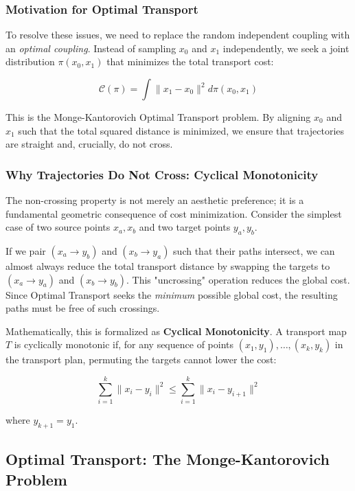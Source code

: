 \documentclass{book}
\begin{document}
\subsubsection*{Motivation for Optimal Transport}
To resolve these issues, we need to replace the random independent coupling with an \textit{optimal coupling}. Instead of sampling $x_0$ and $x_1$ independently, we seek a joint distribution $\pi(x_0, x_1)$ that minimizes the total transport cost:

\begin{equation}
\mathcal{C}(\pi) = \int \| x_1 - x_0 \|^2 d\pi(x_0, x_1)
\end{equation}

This is the Monge-Kantorovich Optimal Transport problem. By aligning $x_0$ and $x_1$ such that the total squared distance is minimized, we ensure that trajectories are straight and, crucially, do not cross.



\subsubsection*{Why Trajectories Do Not Cross: Cyclical Monotonicity}

The non-crossing property is not merely an aesthetic preference; it is a fundamental geometric consequence of cost minimization. Consider the simplest case of two source points $x_a, x_b$ and two target points $y_a, y_b$.

If we pair $(x_a \to y_b)$ and $(x_b \to y_a)$ such that their paths intersect, we can almost always reduce the total transport distance by swapping the targets to $(x_a \to y_a)$ and $(x_b \to y_b)$. This "uncrossing" operation reduces the global cost. Since Optimal Transport seeks the \textit{minimum} possible global cost, the resulting paths must be free of such crossings.

Mathematically, this is formalized as \textbf{Cyclical Monotonicity}. A transport map $T$ is cyclically monotonic if, for any sequence of points $(x_1, y_1), \dots, (x_k, y_k)$ in the transport plan, permuting the targets cannot lower the cost:

\begin{equation}
\sum_{i=1}^k \| x_i - y_i \|^2 \leq \sum_{i=1}^k \| x_i - y_{i+1} \|^2
\end{equation}

where $y_{k+1} = y_1$.

\subsection{Optimal Transport: The Monge-Kantorovich Problem}
\end{document}
